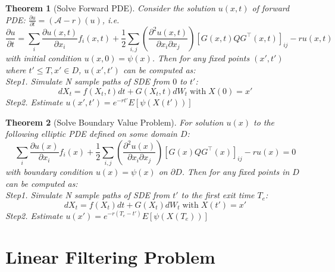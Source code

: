 \documentclass{ctexart}
\newtheorem{theorem}{Theorem}
\begin{document}
\begin{theorem}[Solve Forward PDE]
    Consider the solution $u(x, t)$ of forward PDE: $\frac{\partial u}{\partial t}=(\mathcal{A}-r)(u)$, i.e.
    \begin{equation}
        \frac{\partial u}{\partial t}=\sum_{i} \frac{\partial u(x, t)}{\partial x_{i}} f_{i}(x, t)+\frac{1}{2} \sum_{i, j}\left(\frac{\partial^{2}u(x, t)}{\partial x_{i} \partial x_{j}}\right)\left[G(x, t) Q G^{\top}(x, t)\right]_{i j} - ru(x, t)
    \end{equation}
    with initial condition $u(x, 0)=\psi(x)$. Then for any fixed points $(x', t')$ where $t'\leq T, x'\in D$, $u(x', t')$ can be computed as:\\
    Step1. Simulate N sample paths of SDE from $0$ to $t'$:
    \begin{equation}
        dX_t=f(X_t, t)dt + G(X_t, t)dW_t\operatorname{with}X(0)=x'
    \end{equation}
    Step2. Estimate $u(x', t') = e^{-rt'}E\left[\psi(X(t'))\right]$
\end{theorem}
\begin{theorem}[Solve Boundary Value Problem]
    For solution $u(x)$ to the following elliptic PDE defined on some domain $D$:
    \begin{equation}
        \sum_{i} \frac{\partial u(x)}{\partial x_{i}} f_{i}(x)+\frac{1}{2} \sum_{i, j}\left(\frac{\partial^{2}u(x)}{\partial x_{i} \partial x_{j}}\right)\left[G(x) Q G^{\top}(x)\right]_{i j} - ru(x)=0
    \end{equation}
    with boundary condition $u(x)=\psi(x)$ on $\partial D$. Then for any fixed points in $D$ can be computed as:\\
    Step1. Simulate N sample paths of SDE from $t'$ to the first exit time $T_e$:
    \begin{equation}
        dX_t=f(X_t)dt + G(X_t)dW_t\operatorname{with}X(t')=x'
    \end{equation}
    Step2. Estimate $u(x') = e^{-r(T_e-t')}E\left[\psi(X(T_e))\right]$
\end{theorem}

\section{Linear Filtering Problem}
\end{document}
